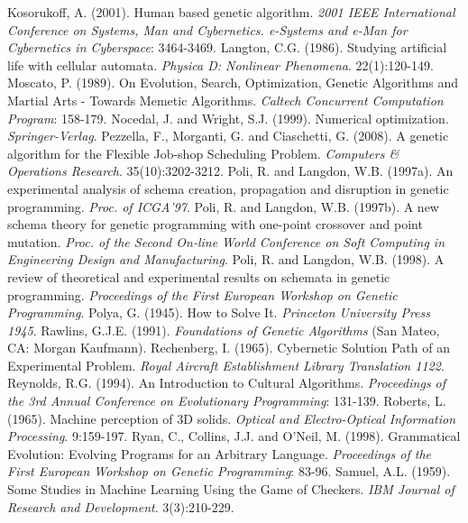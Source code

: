 \documentclass[spanish,a4paper,12pt,twoside]{report}
\begin{document}
\begin{thebibliography}{00}
   Kosorukoff, A. (2001). Human based genetic algorithm. \emph{2001 IEEE International Conference on Systems, Man and Cybernetics. e-Systems and e-Man for Cybernetics in Cyberspace}: 3464-3469.
   Langton, C.G. (1986). Studying artificial life with cellular automata. \emph{Physica D: Nonlinear Phenomena}. 22(1):120-149.
   Moscato, P. (1989). On Evolution, Search, Optimization, Genetic Algorithms and Martial Arts - Towards Memetic Algorithms. \emph{Caltech Concurrent Computation Program}: 158-179.
   Nocedal, J. and Wright, S.J. (1999). Numerical optimization. \emph{Springer-Verlag}.
   Pezzella, F., Morganti, G. and Ciaschetti, G. (2008). A genetic algorithm for the Flexible Job-shop Scheduling Problem. \emph{Computers \& Operations Research}. 35(10):3202-3212.
   Poli, R. and Langdon, W.B. (1997a). An experimental analysis of schema creation, propagation and disruption in genetic programming. \emph{Proc. of ICGA'97}.
   Poli, R. and Langdon, W.B. (1997b). A new schema theory for genetic programming with one-point crossover and point mutation. \emph{Proc. of the Second On-line World Conference on Soft Computing in Engineering Design and Manufacturing}.
   Poli, R. and Langdon, W.B. (1998). A review of theoretical and experimental results on schemata in genetic programming. \emph{Proceedings of the First European Workshop on Genetic Programming}.
   Polya, G. (1945). How to Solve It. \emph{Princeton University Press 1945}.
   Rawlins, G.J.E. (1991). \emph{Foundations of Genetic Algorithms} (San Mateo, CA: Morgan Kaufmann).
   Rechenberg, I. (1965). Cybernetic Solution Path of an Experimental Problem. \emph{Royal Aircraft Establishment Library Translation 1122}.
   Reynolds, R.G. (1994). An Introduction to Cultural Algorithms. \emph{Proceedings of the 3rd Annual Conference on Evolutionary Programming}: 131-139.
   Roberts, L. (1965). Machine perception of 3D solids. \emph{Optical and Electro-Optical Information Processing}. 9:159-197.
   Ryan, C., Collins, J.J. and O'Neil, M. (1998). Grammatical Evolution: Evolving Programs for an Arbitrary Language. \emph{Proceedings of the First European Workshop on Genetic Programming}: 83-96.
   Samuel, A.L. (1959). Some Studies in Machine Learning Using the Game of Checkers. \emph{IBM Journal of Research and Development}. 3(3):210-229.

\end{thebibliography}
\end{document}
